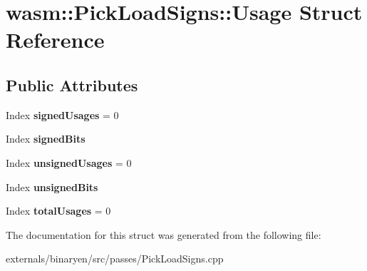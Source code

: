 \hypertarget{structwasm_1_1_pick_load_signs_1_1_usage}{}\section{wasm\+:\+:Pick\+Load\+Signs\+:\+:Usage Struct Reference}
\label{structwasm_1_1_pick_load_signs_1_1_usage}
\subsection*{Public Attributes}
\begin{DoxyCompactItemize}
\item 
\mbox{\label{structwasm_1_1_pick_load_signs_1_1_usage_a1839fc450274c82a6891e604a736a38e}} 
Index {\bfseries signed\+Usages} = 0
\item 
\mbox{\label{structwasm_1_1_pick_load_signs_1_1_usage_a66c240535689138144e45a92e1b9195f}} 
Index {\bfseries signed\+Bits}
\item 
\mbox{\label{structwasm_1_1_pick_load_signs_1_1_usage_a747bc1bec8957b610e5e276e1907bff4}} 
Index {\bfseries unsigned\+Usages} = 0
\item 
\mbox{\label{structwasm_1_1_pick_load_signs_1_1_usage_a6f54b63392e383495d1d081d2ceca02a}} 
Index {\bfseries unsigned\+Bits}
\item 
\mbox{\label{structwasm_1_1_pick_load_signs_1_1_usage_aa9262a9aa71ecd0566b530df98dcf843}} 
Index {\bfseries total\+Usages} = 0
\end{DoxyCompactItemize}


The documentation for this struct was generated from the following file\+:\begin{DoxyCompactItemize}
\item 
externals/binaryen/src/passes/Pick\+Load\+Signs.\+cpp\end{DoxyCompactItemize}
